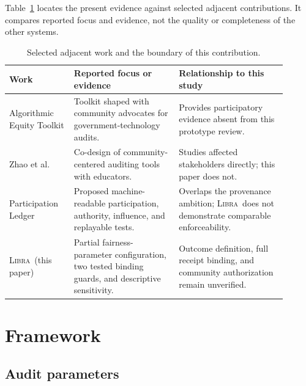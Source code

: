 \documentclass[10pt]{article}
\newcommand{\libra}{\textsc{Libra}}
\begin{document}
Table~\ref{tab:related-comparison} locates the present evidence against selected
adjacent contributions. It compares reported focus and evidence, not the
quality or completeness of the other systems.

\begin{table}[ht]
\centering
\caption{Selected adjacent work and the boundary of this contribution.}
\label{tab:related-comparison}
\begin{tabular}{p{0.21\linewidth}p{0.34\linewidth}p{0.35\linewidth}}
\toprule
Work & Reported focus or evidence & Relationship to this study \\
\midrule
Algorithmic Equity Toolkit \cite{katell2020} & Toolkit shaped with community advocates for government-technology audits. & Provides participatory evidence absent from this prototype review. \\
Zhao et al. \cite{zhao2026} & Co-design of community-centered auditing tools with educators. & Studies affected stakeholders directly; this paper does not. \\
Participation Ledger \cite{mushkani2026ledger} & Proposed machine-readable participation, authority, influence, and replayable tests. & Overlaps the provenance ambition; \libra\ does not demonstrate comparable enforceability. \\
\libra\ (this paper) & Partial fairness-parameter configuration, two tested binding guards, and descriptive sensitivity. & Outcome definition, full receipt binding, and community authorization remain unverified. \\
\bottomrule
\end{tabular}
\end{table}

\section{Framework}

\subsection{Audit parameters}
\end{document}
